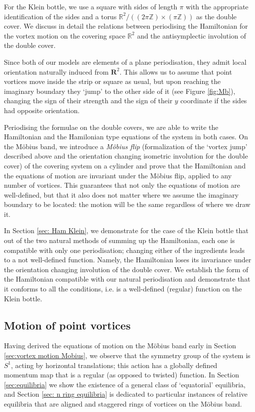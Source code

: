 \documentclass[11pt,twoside]{article}
\theoremstyle{definition}
\numberwithin{equation}{section}
\begin{document}
   For the Klein bottle, we use a square with sides of length $\pi$ with the appropriate identification of the sides and a torus $\mathbb{R}^2/((2\pi\mathbb{Z})\times(\pi\mathbb{Z}))$
   as the double cover. We discuss in detail the relations between periodising the Hamiltonian for the vortex motion on the covering space $\mathbb{R}^2$ and the antisymplectic involution of the double cover. 
   
Since both of our  models are elements of a plane periodisation, they admit local orientation naturally induced from $\mathbf{R
}^2$. This allows us to assume that point vortices move inside the strip or square as usual, but upon reaching the imaginary boundary they `jump' to the other side of it (see Figure \ref{fig:Mb}), changing the sign of their  strength and the sign of their $y$ coordinate if the sides had opposite orientation. 

Periodising the formulae on the double covers, we are able to write the Hamiltonian and the Hamilonian type equations of the system in both cases.  On the M\"obius band, we introduce a \textit{M\"obius flip} (formalization of the `vortex jump' described above and the orientation changing isometric involution for the double cover) of the covering system on a cylinder and prove that the Hamiltonian and the equations of motion are invariant under the M\"obius flip,  applied to any number of vortices. This guarantees that not only the equations of motion are well-defined, but that it also does not matter where we assume the imaginary boundary to be located: the motion will be the same regardless of where we draw it.

In Section \ref{sec: Ham Klein}, we demonstrate for the case of the Klein bottle  that out of the two natural methods of summing up the Hamiltonian, each one is compatible with only one periodisation; changing either of the ingredients leads to a not well-defined function. Namely, the Hamiltonian loses its invariance under  the orientation changing involution of the double cover. We establish the form of the Hamiltonian compatible with our natural periodisation and demonstrate that it conforms to all the conditions, i.e. is a well-defined (regular) function on the Klein bottle. 

   
   \subsection*{Motion of point vortices}
   
   Having derived the equations of motion on the M\"obius band  early in Section \ref{sec:vortex motion Mobius}, we observe that the symmetry group of the system is $S^1$, acting by horizontal translations; this action has a globally defined  momentum map that is a regular (as opposed to twisted) function. In Section \ref{sec:equilibria} we show the existence of a general class of `equatorial' equilibria, and  Section \ref{sec: n ring equilibria} is dedicated to particular instances of relative equilibria that are aligned and staggered rings of vortices on the M\"obius band. 
   
\end{document}
